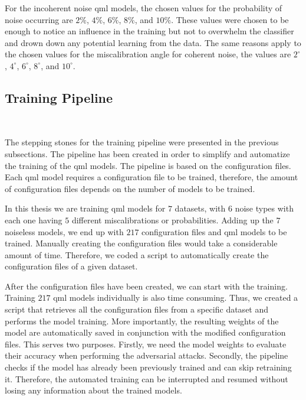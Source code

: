 For the incoherent noise \ac{qml} models, the chosen values for the
probability of noise occurring are \(2\%\), \(4\%\), \(6\%\), \(8\%\),
and \(10\%\). These values were chosen to be enough to notice an
influence in the training but not to overwhelm the classifier and
drown down any potential learning from the data. The same reasons
apply to the chosen values for the miscalibration angle for coherent
noise, the values are \(2^{\circ}\), \(4^{\circ}\), \(6^{\circ}\),
\(8^{\circ}\), and \(10^{\circ}\). \

\subsection{Training Pipeline}\label{subsection:pipeline} \

The stepping stones for the training pipeline were presented
in the previous subsections. The pipeline has been created
in order to simplify and automatize the training of the
\ac{qml} models. The pipeline is based on the configuration
files. Each \ac{qml} model requires a configuration file to
be trained, therefore, the amount of configuration files
depends on the number of models to be trained. \

In this thesis we are training \ac{qml} models for \(7\)
datasets, with \(6\) noise types with each one having \(5\)
different miscalibrations or probabilities. Adding up
the \(7\) noiseless models, we end up with \(217\) configuration
files and \ac{qml} models to be trained. Manually creating
the configuration files would take a considerable
amount of time. Therefore, we coded a script to
automatically create the configuration files of a
given dataset. \

After the configuration files have been created,
we can start with the training. Training \(217\)
\ac{qml} models individually is also time consuming.
Thus, we created a script that retrieves all
the configuration files from a specific dataset
and performs the model training. More importantly,
the resulting weights of the model are automatically
saved in conjunction with the modified configuration
files. This serves two purposes. Firstly, we need the model
weights to evaluate their accuracy when performing the
adversarial attacks. Secondly, the pipeline checks
if the model has already been previously trained and
can skip retraining it. Therefore, the automated training
can be interrupted and resumed without losing any information
about the trained models. \

